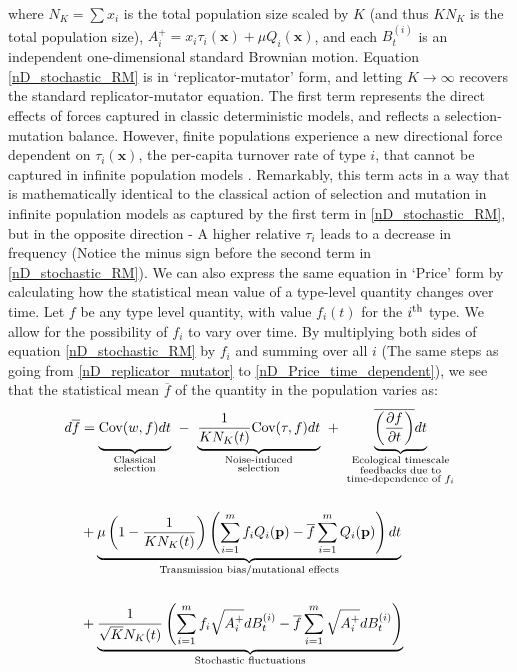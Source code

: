 where $N_K = \sum x_i$ is the total population size scaled by $K$ (and thus $KN_K$ is the total population size), $A_i^{+} = x_i\tau_i(\mathbf{x}) + \mu Q_i(\mathbf{x})$, and each $B^{(i)}_t$ is an independent one-dimensional standard Brownian motion. Equation \eqref{nD_stochastic_RM} is in `replicator-mutator' form, and letting $K \to \infty$ recovers the standard replicator-mutator equation. The first term represents the direct effects of forces captured in classic deterministic models, and reflects a selection-mutation balance. However, finite populations experience a new directional force dependent on $\tau_i(\mathbf{x})$, the per-capita turnover rate of type $i$, that cannot be captured in infinite population models \citep{kuosmanen_turnover_2022}. Remarkably, this term acts in a way that is mathematically identical to the classical action of selection and mutation in infinite population models as captured by the first term in \eqref{nD_stochastic_RM}, but in the opposite direction - A higher relative $\tau_i$ leads to a decrease in frequency (Notice the minus sign before the second term in \eqref{nD_stochastic_RM}). We can also express the same equation in `Price' form by calculating how the statistical mean value of a type-level quantity changes over time. Let $f$ be any type level quantity, with value $f_i(t)$ for the $i\textsuperscript{th}$ type. We allow for the possibility of $f_i$ to vary over time. By multiplying both sides of
equation \eqref{nD_stochastic_RM} by $f_i$ and summing over all $i$ (The same steps as going from \eqref{nD_replicator_mutator} to \eqref{nD_Price_time_dependent}), we see that the statistical mean $\overline{f}$ of the quantity in the population varies as:
\begin{equation}
\label{nD_stochastic_Price}
\begin{aligned}
d\overline{f} &= {\underbrace{\vphantom{ \frac{1}{KN_K(t)} }\textrm{Cov}(w,f)dt}_{\substack{\text{Classical} \\ \text{selection}}}} \ - \ {\underbrace{\frac{1}{KN_K(t)}\textrm{Cov}(\tau,f)dt}_{\substack{\text{Noise-induced} \\ \text{selection}}}} \ +  \  {\underbrace{\vphantom{ \frac{1}{KN_K(t)} }\overline{\left(\frac{\partial f}{\partial t}\right)}dt}_{\substack{\text{Ecological timescale} \\ \text{feedbacks due to} \\ \text{time-dependence of $f_i$}}}}\\[15pt]
&+ \underbrace{\mu\left(1-\frac{1}{KN_K(t)}\right)\left(\sum\limits_{i=1}^{m}f_iQ_i(\mathbf{p}) - \overline{f}\sum\limits_{i=1}^{m}Q_i(\mathbf{p})\right)dt}_{\text{Transmission bias/mutational effects}}\\[15pt]
&+ \underbrace{\frac{1}{\sqrt{K}N_{K}(t)}\left(\sum\limits_{i=1}^{m}f_i\sqrt{A_i^+}dB_{t}^{(i)} - \overline{f}\sum\limits_{i=1}^{m}\sqrt{A_i^+}dB_{t}^{(i)}\right)}_{\text{Stochastic fluctuations}}
\end{aligned} 
\end{equation}
